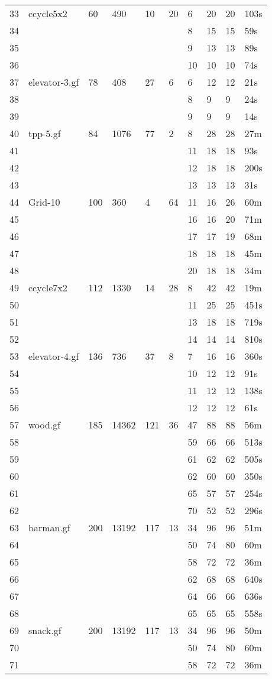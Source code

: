 \documentclass{article}
\begin{document}
\begin{longtable}{|l |l |l |l |l |l |l |l |l |l |}
33&ccycle5x2&60&490&10&20&6&20&20&103s\\
34&&&&&&8&15&15&59s\\
35&&&&&&9&13&13&89s\\
36&&&&&&10&10&10&74s\\
37&elevator-3.gf&78&408&27&6&6&12&12&21s\\
38&&&&&&8&9&9&24s\\
39&&&&&&9&9&9&14s\\
40&tpp-5.gf&84&1076&77&2&8&28&28&27m\\
41&&&&&&11&18&18&93s\\
42&&&&&&12&18&18&200s\\
43&&&&&&13&13&13&31s\\
44&Grid-10&100&360&4&64&11&16&26&60m\\
45&&&&&&16&16&20&71m\\
46&&&&&&17&17&19&68m\\
47&&&&&&18&18&18&45m\\
48&&&&&&20&18&18&34m\\
49&ccycle7x2&112&1330&14&28&8&42&42&19m\\
50&&&&&&11&25&25&451s\\
51&&&&&&13&18&18&719s\\
52&&&&&&14&14&14&810s\\
53&elevator-4.gf&136&736&37&8&7&16&16&360s\\
54&&&&&&10&12&12&91s\\
55&&&&&&11&12&12&138s\\
56&&&&&&12&12&12&61s\\
57&wood.gf&185&14362&121&36&47&88&88&56m\\
58&&&&&&59&66&66&513s\\
59&&&&&&61&62&62&505s\\
60&&&&&&62&60&60&350s\\
61&&&&&&65&57&57&254s\\
62&&&&&&70&52&52&296s\\
63&barman.gf&200&13192&117&13&34&96&96&51m\\
64&&&&&&50&74&80&60m\\
65&&&&&&58&72&72&36m\\
66&&&&&&62&68&68&640s\\
67&&&&&&64&66&66&636s\\
68&&&&&&65&65&65&558s\\
69&snack.gf&200&13192&117&13&34&96&96&50m\\
70&&&&&&50&74&80&60m\\
71&&&&&&58&72&72&36m\\

\end{longtable}
\end{document}
